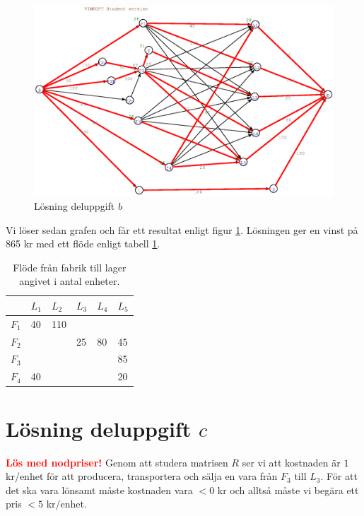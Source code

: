 \documentclass[titlepage, a4paper]{article}
\newcommand{\todo}[1] {\textbf{\textcolor{red}{#1}}}
\begin{document}
\begin{figure}[h!]
\centerline{\includegraphics[scale=0.65]{laborationsuppgift_13b_solved.ps}}
\caption{Lösning deluppgift $b$} \label{uppgiftb-graf}
\end{figure}

Vi löser sedan grafen och får ett resultat enligt figur \ref{uppgiftb-graf}. Lösningen ger en vinst på 865 kr med ett flöde enligt tabell \ref{uppgiftb-flode}.

\begin{table}[h!]
    \centering
    \begin{tabular}{ | l | l | l | l | l | l | }
        \hline
        {} & {$L_{1}$} & {$L_{2}$} & {$L_{3}$} & {$L_{4}$} & {$L_{5}$} \\\hline
        {$F_{1}$} & {40} & {110} & {} & {} & {} \\\hline
        {$F_{2}$} & {} & {} & {25} & {80} & {45} \\\hline
        {$F_{3}$} & {} & {} & {} & {} & {85} \\\hline
        {$F_{4}$} & {40} & {} & {} & {} & {20} \\\hline
    \end{tabular}
    \caption{Flöde från fabrik till lager angivet i antal enheter.} \label{uppgiftb-flode}
\end{table}

\section{Lösning deluppgift $c$}
\todo{Lös med nodpriser!}\newline
Genom att studera matrisen $R$ ser vi att kostnaden är $1$ kr/enhet för att producera, transportera och sälja en vara från $F_{3}$ till $L_{3}$. För att det ska vara lönsamt måste kostnaden vara $<0$ kr och alltså måste vi begära ett pris $<5$ kr/enhet.
\end{document}
